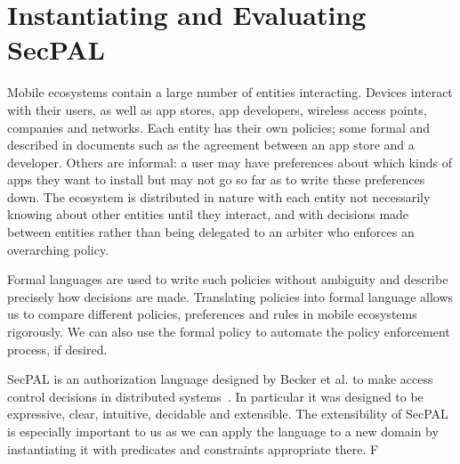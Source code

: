 \documentclass[thesis.tex]{subfiles}
\begin{document}
\chapter{Instantiating and Evaluating SecPAL}
\label{chap:apppal}


Mobile ecosystems contain a large number of entities interacting.
Devices interact with their users, as well as app stores, app developers, wireless access points, companies and networks.
Each entity has their own policies; some formal and described in documents such as the agreement between an app store and a developer.
Others are informal: a user may have preferences about which kinds of apps they want to install but may not go so far as to write these preferences down.
The ecosystem is distributed in nature with each entity not necessarily knowing about other entities until they interact, and with decisions made between entities rather than being delegated to an arbiter who enforces an overarching policy.

Formal languages are used to write such policies without ambiguity and describe precisely how decisions are made.
Translating policies into formal language allows us to compare different policies, preferences and rules in mobile ecosystems rigorously.
We can also use the formal policy to automate the policy enforcement process, if desired.

SecPAL is an authorization language designed by Becker et al{.} to make access control decisions in distributed systems~\cite{becker_secpal:_2009}.
In particular it was designed to be expressive, clear, intuitive, decidable and extensible.
The extensibility of SecPAL is especially important to us as we can apply the language to a new domain by instantiating it with predicates and constraints appropriate there.
F
\end{document}
